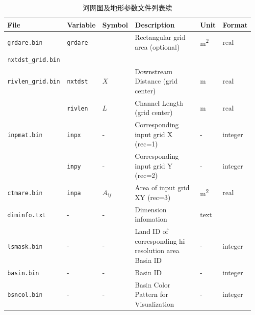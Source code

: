 \begin{table}[]
\centering
\caption{河网图及地形参数文件列表续}
\label{tab:河网图及地形参数文件列表2}
    \begin{tabular}[h]{p{3.5cm}p{1.5cm}p{1.5cm}p{5cm}p{1cm}p{1cm}} %
    \toprule
    File             & Variable & Symbol                             & Description                                          & Unit     & Format  \\ \midrule
    \texttt{grdare.bin}       & \texttt{grdare}   & -                                  & Rectangular grid area (optional)                     & \unit{m^2}       & real    \\
    \texttt{nxtdst\_grid.bin} &          &                                    &                                                      &          &         \\
    \texttt{rivlen\_grid.bin} & \texttt{nxtdst}   & $X$                                  & Downstream Distance (grid center)                    & m        & real    \\
                                        & \texttt{rivlen}    & $L$                            & Channel Length (grid center)       &    m                             & real        \\
    \texttt{inpmat.bin}       & \texttt{inpx}     & -                                  & Corresponding input grid X (rec=1) & -        & integer \\
                                       & \texttt{inpy}     & -                               & Corresponding input grid Y (rec=2)    & -        & integer  \\
    \texttt{ctmare.bin}       & \texttt{inpa}     & $A_{ij}$                            & Area of input grid XY (rec=3)              & \unit{m^2}     & real    \\
    \texttt{diminfo.txt}      & -        & -                                  & Dimension infomation                         & text     &         \\
    \texttt{lsmask.bin}       & -        & -                                  & Land ID of corresponding hi resolution area Basin ID & -        & integer \\
    \texttt{basin.bin}        & -        & -                                  & Basin ID                                             & -        & integer \\
    \texttt{bsncol.bin}       & -        & -                                  & Basin Color Pattern for Visualization                & -        & integer \\

\end{tabular}
\end{table}
